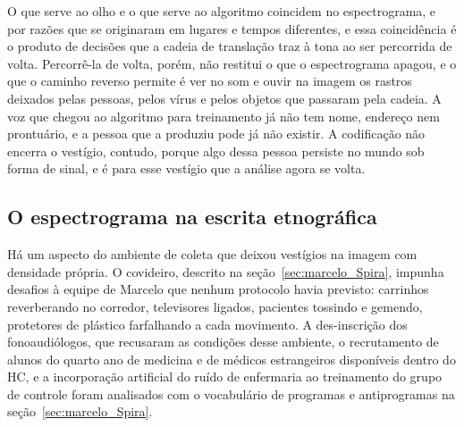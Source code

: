 O que serve ao olho e o que serve ao algoritmo coincidem no espectrograma, e por razões que se originaram em lugares e tempos diferentes, e essa coincidência é o produto de decisões que a cadeia de translação traz à tona ao ser percorrida de volta. Percorrê-la de volta, porém, não restitui o que o espectrograma apagou, e o que o caminho reverso permite é ver no som e ouvir na imagem os rastros deixados pelas pessoas, pelos vírus e pelos objetos que passaram pela cadeia. A voz que chegou ao algoritmo para treinamento já não tem nome, endereço nem prontuário, e a pessoa que a produziu pode já não existir. A codificação não encerra o vestígio, contudo, porque algo dessa pessoa persiste no mundo sob forma de sinal, e é para esse vestígio que a análise agora se volta.

\subsection{O espectrograma na escrita etnográfica}
\label{subsec:espectrograma_escrita}

Há um aspecto do ambiente de coleta que deixou vestígios na imagem com densidade própria. O covideiro, descrito na seção~\ref{sec:marcelo_Spira}, impunha desafios à equipe de Marcelo que nenhum protocolo havia previsto: carrinhos reverberando no corredor, televisores ligados, pacientes tossindo e gemendo, protetores de plástico farfalhando a cada movimento. A des-inscrição dos fonoaudiólogos, que recusaram as condições desse ambiente, o recrutamento de alunos do quarto ano de medicina e de médicos estrangeiros disponíveis dentro do HC, e a incorporação artificial do ruído de enfermaria ao treinamento do grupo de controle foram analisados com o vocabulário de programas e antiprogramas na seção~\ref{sec:marcelo_Spira}.

